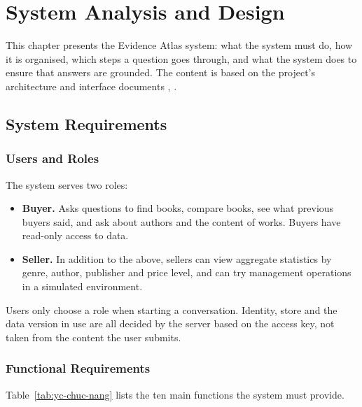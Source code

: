 \chapter{System Analysis and Design}
\label{ch:thiet-ke}

This chapter presents the Evidence Atlas system: what the system must do, how it is organised, which steps a question goes through, and what the system does to ensure that answers are grounded. The content is based on the project's architecture and interface documents , .

\section{System Requirements}

\subsection{Users and Roles}

The system serves two roles:

\begin{itemize}
    \item \textbf{Buyer.} Asks questions to find books, compare books, see what previous buyers said, and ask about authors and the content of works. Buyers have read-only access to data.
    \item \textbf{Seller.} In addition to the above, sellers can view aggregate statistics by genre, author, publisher and price level, and can try management operations in a simulated environment.
\end{itemize}

Users only choose a role when starting a conversation. Identity, store and the data version in use are all decided by the server based on the access key, not taken from the content the user submits.

\subsection{Functional Requirements}

Table~\ref{tab:yc-chuc-nang} lists the ten main functions the system must provide.

